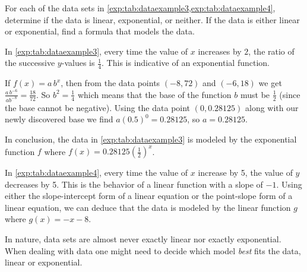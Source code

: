 \begin{pccexample}
	For each of the data sets in \cref{exp:tab:dataexample3,exp:tab:dataexample4}, determine if the data is 
	linear, exponential, or neither.  If the data is either linear or exponential, find a formula that models the data.
										
	In \cref{exp:tab:dataexample3}, every time the value of $x$ increases by $2$, the ratio of the successive $y$-values is $\frac{1}{4}$.  
	This is indicative of an exponential function.  
										
	If $f(x)=a\,b^x$, then from the data points $(-8,72)$ and $(-6,18)$ we get $\frac{a\,b^{-6}}{a b^{-8}}=\frac{18}{72}$.  
	So $b^2=\frac{1}{4}$ which means that the base of the function $b$ must be $\frac{1}{2}$ (since the base cannot be negative).  
	Using the data point $(0,0.28125)$ along with our newly discovered base we find $a(0.5)^0=0.28125$, so $a=0.28125$.  
										
	In conclusion, the data in \cref{exp:tab:dataexample3} is modeled by the exponential function $f$ where $f(x)=0.28125\left(\frac12\right)^x$.
										
	In \cref{exp:tab:dataexample4}, every time the value of $x$ increase by 5, the value of $y$ decreases by 5.  This is 
	the behavior of a linear function with a slope of $-1$.  Using either the slope-intercept form of a linear 
	equation or the point-slope form of a linear equation, we can deduce that the data is modeled by the linear 
	function $g$ where $g(x)=-x-8$.
\end{pccexample}
			
In nature, data sets are almost never exactly linear nor exactly exponential.  When dealing with data one 
might need to decide which model \emph{best} fits the data, linear or exponential.
			
